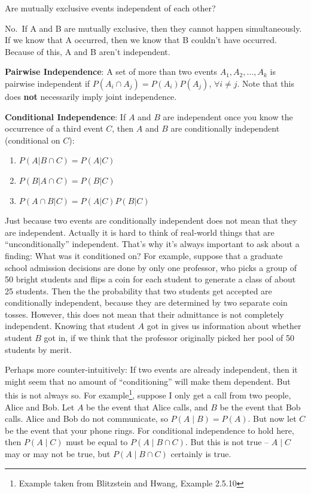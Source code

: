 \documentclass[
]{book}
\providecommand{\tightlist}{%
  \setlength{\itemsep}{0pt}\setlength{\parskip}{0pt}}
\theoremstyle{definition}
\theoremstyle{definition}
\theoremstyle{definition}
\theoremstyle{definition}
\theoremstyle{remark}
\begin{document}
Are mutually exclusive events independent of each other?

No.~If A and B are mutually exclusive, then they cannot happen simultaneously. If we know that A occurred, then we know that B couldn't have occurred. Because of this, A and B aren't independent.

\textbf{Pairwise Independence}: A set of more than two events \(A_1, A_2, \dots, A_k\) is pairwise independent if \(P(A_i\cap A_j)=P(A_i)P(A_j)\), \(\forall i\neq j\). Note that this does \textbf{not} necessarily imply joint independence.

\textbf{Conditional Independence}: If \(A\) and \(B\) are independent once you know the occurrence of a third event \(C\), then \(A\) and \(B\) are conditionally independent (conditional on \(C\)):

\begin{enumerate}
\def\labelenumi{\arabic{enumi}.}
\tightlist
\item
  \(P(A|B \cap C)=P(A|C)\)
\item
  \(P(B|A \cap C)=P(B|C)\)
\item
  \(P(A\cap B|C)=P(A|C)P(B|C)\)
\end{enumerate}

Just because two events are conditionally independent does not mean that they are independent. Actually it is hard to think of real-world things that are ``unconditionally'' independent. That's why it's always important to ask about a finding: What was it conditioned on? For example, suppose that a graduate school admission decisions are done by only one professor, who picks a group of 50 bright students and flips a coin for each student to generate a class of about 25 students. Then the the probability that two students get accepted are conditionally independent, because they are determined by two separate coin tosses. However, this does not mean that their admittance is not completely independent. Knowing that student \(A\) got in gives us information about whether student \(B\) got in, if we think that the professor originally picked her pool of 50 students by merit.

Perhaps more counter-intuitively: If two events are already independent, then it might seem that no amount of ``conditioning'' will make them dependent. But this is not always so. For example\footnote{Example taken from Blitzstein and Hwang, Example 2.5.10}, suppose I only get a call from two people, Alice and Bob. Let \(A\) be the event that Alice calls, and \(B\) be the event that Bob calls. Alice and Bob do not communicate, so \(P(A \mid B) = P(A).\) But now let \(C\) be the event that your phone rings. For conditional independence to hold here, then \(P(A \mid C)\) must be equal to \(P(A \mid B \cap C).\) But this is not true -- \(A \mid C\) may or may not be true, but \(P(A \mid B \cap C)\) certainly is true.
\end{document}
